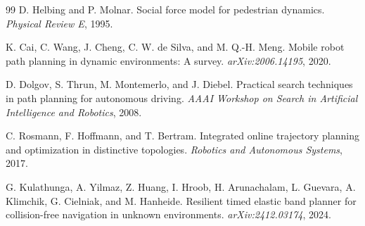 \documentclass[10pt,twocolumn,letterpaper]{article}
\begin{document}
\begin{thebibliography}{99}
D. Helbing and P. Molnar.
Social force model for pedestrian dynamics.
\emph{Physical Review E}, 1995.

K. Cai, C. Wang, J. Cheng, C. W. de Silva, and M. Q.-H. Meng.
Mobile robot path planning in dynamic environments: A survey.
\emph{arXiv:2006.14195}, 2020.

D. Dolgov, S. Thrun, M. Montemerlo, and J. Diebel.
Practical search techniques in path planning for autonomous driving.
\emph{AAAI Workshop on Search in Artificial Intelligence and Robotics}, 2008.

C. Rosmann, F. Hoffmann, and T. Bertram.
Integrated online trajectory planning and optimization in distinctive topologies.
\emph{Robotics and Autonomous Systems}, 2017.

G. Kulathunga, A. Yilmaz, Z. Huang, I. Hroob, H. Arunachalam, L. Guevara, A. Klimchik, G. Cielniak, and M. Hanheide.
Resilient timed elastic band planner for collision-free navigation in unknown environments.
\emph{arXiv:2412.03174}, 2024.

\end{thebibliography}
\end{document}
